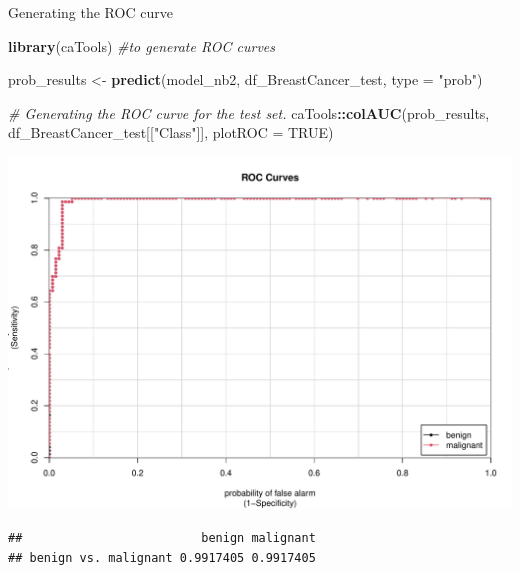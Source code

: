 \documentclass[12pt,ignorenonframetext,]{beamer}
\newenvironment{Shaded}{\begin{snugshade}}{\end{snugshade}}
\newcommand{\CommentTok}[1]{\textcolor[rgb]{0.56,0.35,0.01}{\textit{#1}}}
\newcommand{\DataTypeTok}[1]{\textcolor[rgb]{0.13,0.29,0.53}{#1}}
\newcommand{\KeywordTok}[1]{\textcolor[rgb]{0.13,0.29,0.53}{\textbf{#1}}}
\newcommand{\NormalTok}[1]{#1}
\newcommand{\OperatorTok}[1]{\textcolor[rgb]{0.81,0.36,0.00}{\textbf{#1}}}
\newcommand{\OtherTok}[1]{\textcolor[rgb]{0.56,0.35,0.01}{#1}}
\newcommand{\StringTok}[1]{\textcolor[rgb]{0.31,0.60,0.02}{#1}}
\begin{document}
\begin{frame}[fragile]{Generating the ROC curve}
\protect\hypertarget{generating-the-roc-curve}{}

\tiny

\begin{Shaded}
\begin{Highlighting}[]
\KeywordTok{library}\NormalTok{(caTools) }\CommentTok{#to generate ROC curves}

\NormalTok{prob_results <-}\StringTok{ }\KeywordTok{predict}\NormalTok{(model_nb2, df_BreastCancer_test, }\DataTypeTok{type =} \StringTok{"prob"}\NormalTok{)}

\CommentTok{# Generating the ROC curve for the test set.}
\NormalTok{caTools}\OperatorTok{::}\KeywordTok{colAUC}\NormalTok{(prob_results, df_BreastCancer_test[[}\StringTok{"Class"}\NormalTok{]], }\DataTypeTok{plotROC =} \OtherTok{TRUE}\NormalTok{)}
\end{Highlighting}
\end{Shaded}

\begin{center}\includegraphics[width=0.7\linewidth,height=0.6\textheight]{figs/unnamed-chunk-9} \end{center}

\begin{verbatim}
##                         benign malignant
## benign vs. malignant 0.9917405 0.9917405
\end{verbatim}

\normalsize

\end{frame}
\end{document}
